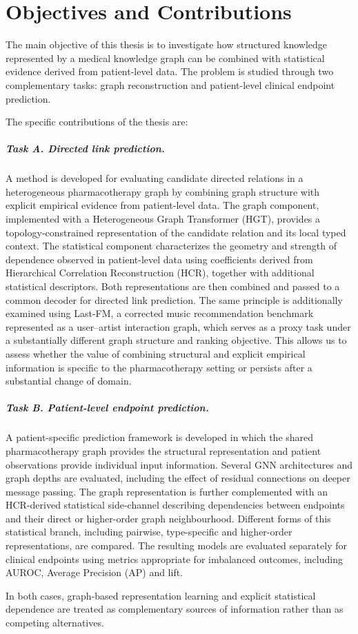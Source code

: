 \chapter{Objectives and Contributions}
\label{ch:objectives}

The main objective of this thesis is to investigate how structured knowledge represented by a medical knowledge graph can be combined with statistical evidence derived from patient-level data.
The problem is studied through two complementary tasks: graph reconstruction and patient-level clinical endpoint prediction.

The specific contributions of the thesis are:

\paragraph{Task A. Directed link prediction.}
A method is developed for evaluating candidate directed relations in a heterogeneous pharmacotherapy 
graph by combining graph structure with explicit empirical evidence from patient-level data. 
The graph component, implemented with a Heterogeneous Graph Transformer (HGT), provides a 
topology-constrained representation of the candidate relation and its local typed context. 
The statistical component characterizes the geometry and strength of dependence observed in 
patient-level data using coefficients derived from Hierarchical Correlation Reconstruction (HCR), 
together with additional statistical descriptors. Both representations are then combined and passed 
to a common decoder for directed link prediction. The same principle is additionally examined using 
Last-FM, a corrected music recommendation benchmark represented as a user–artist interaction graph, 
which serves as a proxy task under a substantially different graph structure and ranking objective. 
This allows us to assess whether the value of combining structural and explicit empirical 
information is specific to the pharmacotherapy setting or persists after a substantial change 
of domain.

\paragraph{Task B. Patient-level endpoint prediction.}
A patient-specific prediction framework is developed in which the shared pharmacotherapy graph provides the structural representation and patient observations provide individual input information.
Several GNN architectures and graph depths are evaluated, including the effect of residual connections on deeper message passing.
The graph representation is further complemented with an HCR-derived statistical side-channel describing dependencies between endpoints and their direct or higher-order graph neighbourhood.
Different forms of this statistical branch, including pairwise, type-specific and higher-order representations, are compared.
The resulting models are evaluated separately for clinical endpoints using metrics appropriate for imbalanced outcomes, including AUROC, Average Precision (AP) and lift.

In both cases, graph-based representation learning and explicit statistical dependence are treated as complementary sources of information rather than as competing alternatives.
